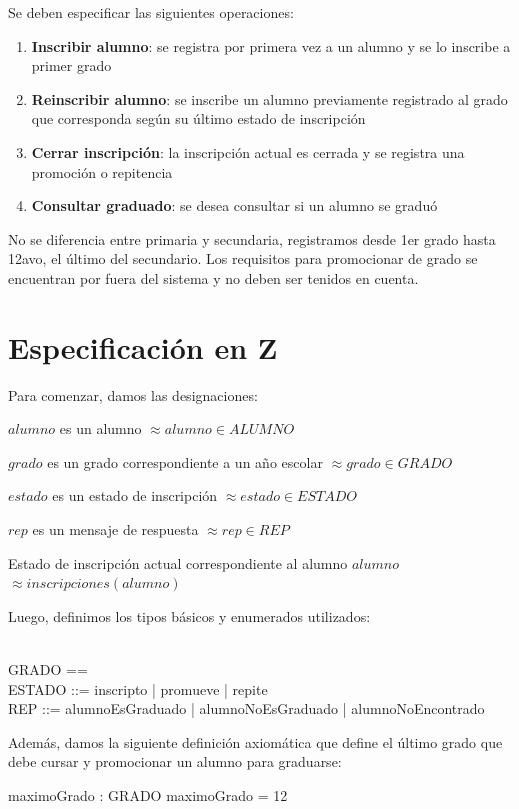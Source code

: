 \documentclass{article}
\newcommand{\desig}[2]{\item #1 $\approx #2$}
\newenvironment{designations}
  {\begin{leftbar}
    \begin{list}{}{\setlength{\labelsep}{0cm}
                   \setlength{\labelwidth}{0cm}
                   \setlength{\listparindent}{0cm}
                   \setlength{\rightmargin}{\leftmargin}}}
  {\end{list}\end{leftbar}}
\begin{document}
Se deben especificar las siguientes operaciones:

\begin{enumerate}
  \item \textbf{Inscribir alumno}: se registra por primera vez a un alumno y se lo inscribe a primer grado
  
  \item \textbf{Reinscribir alumno}: se inscribe un alumno previamente registrado al grado que corresponda según su último estado de inscripción
  
  \item \textbf{Cerrar inscripción}: la inscripción actual es cerrada y se registra una promoción o repitencia
  
  \item \textbf{Consultar graduado}: se desea consultar si un alumno se graduó
\end{enumerate}

No se diferencia entre primaria y secundaria, registramos desde 1er grado hasta 12avo, el último del secundario. Los requisitos para promocionar de grado se encuentran por fuera del sistema y no deben ser tenidos en cuenta.

\section{Especificación en Z}

Para comenzar, damos las designaciones:
\begin{designations}
  \desig{$alumno$ es un alumno}{alumno \in ALUMNO}
  \desig{$grado$ es un grado correspondiente a un año escolar}{grado \in GRADO}
  \desig{$estado$ es un estado de inscripción}{estado \in ESTADO}
  \desig{$rep$ es un mensaje de respuesta}{rep \in REP}
  \desig{Estado de inscripción actual correspondiente al alumno $alumno$}{inscripciones(alumno)}
\end{designations}

Luego, definimos los tipos básicos y enumerados utilizados:
\begin{zed}
  [ALUMNO] \\
  GRADO == \nat \\
  ESTADO ::= inscripto | promueve | repite \\
  REP ::= alumnoEsGraduado | alumnoNoEsGraduado | alumnoNoEncontrado
\end{zed}

Además, damos la siguiente definición axiomática que define el último grado que debe cursar y promocionar un alumno para graduarse:
\begin{axdef}
    maximoGrado : GRADO
\where
    maximoGrado = 12
\end{axdef}
\end{document}
